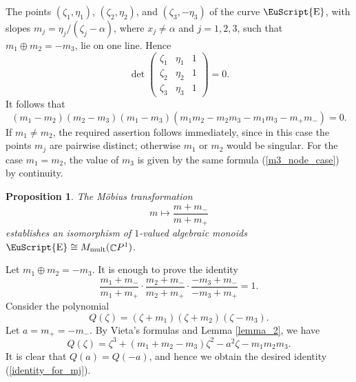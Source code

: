 \documentclass[14pt, dvipsnames]{extarticle}
\makeatletter
\theoremstyle{plain}
\newtheorem{prop}{Proposition}
\theoremstyle{definition}
\theoremstyle{remark}
\renewenvironment{proof}[1][\proofname]{
  \par\pushQED{\qed}\normalfont
  \topsep6\p@\@plus6\p@\relax
  \trivlist\item[\hskip\labelsep\bfseries\itshape #1\@addpunct{.}]
}{\popQED\endtrivlist\@endpefalse}
\DeclareMathOperator{\E}{\EuScript{E}}
\DeclareMathOperator{\Cc}{\mathbb{C}}
\DeclareMathOperator{\mult}{\mathrm{mult}}
\makeatother
\begin{document}
\begin{proof}
The points $(\zeta_1, \eta_1)$, $(\zeta_2, \eta_2)$, and $(\zeta_3, -\eta_3)$ of the curve $\E$, with slopes $m_j = \eta_j/(\zeta_j - \alpha)$, where $x_j\neq \alpha$ and $j = 1, 2, 3$, such that $m_1\oplus m_2 = -m_3$, lie on one line. Hence
$$\det\left (\begin{matrix} \zeta_1 & \eta_1 & 1\\ \zeta_2 & \eta_2 & 1\\ \zeta_3 & \eta_3 & 1  \end{matrix} \right ) = 0.$$
It follows that
$$(m_1 - m_2)(m_2 - m_3)(m_1 - m_3)(m_1m_2 - m_2m_3 - m_1m_3 -m_{+}m_{-}) = 0.$$
If $m_1\neq m_2$, the required assertion follows immediately, since in this case the points $m_j$ are pairwise distinct; otherwise $m_1$ or $m_2$ would be singular. For the case $m_1 = m_2$, the value of $m_3$ is given by the same formula (\ref{m3_node_case}) by continuity. 
\end{proof}

\begin{prop}\label{E_cong_G_m_mult_case}
The Möbius transformation
\begin{equation}\label{Mobius_transform}
m\mapsto \frac{m + m_{-}}{m + m_{+}}
\end{equation}
establishes an isomorphism of $1$-valued algebraic monoids $\E\cong M_{\mult}(\Cc\!P^1)$.
\end{prop}

\begin{proof}
Let $m_1\oplus m_2 = -m_3$. It is enough to prove the identity
\begin{equation}\label{identity_for_mj}
\frac{m_1 + m_{-}}{m_1 + m_{+}}\cdot \frac{m_2 + m_{-}}{m_2 + m_{+}}\cdot \frac{-m_3 + m_{-}}{-m_3 + m_{+}} = 1.
\end{equation}
Consider the polynomial
$$Q(\zeta) = (\zeta + m_1)(\zeta + m_2)(\zeta - m_3).$$
Let $a = m_{+} = -m_{-}$. By Vieta's formulas and Lemma \ref{lemma_2}, we have
$$Q(\zeta) = \zeta^3 + (m_1 + m_2 - m_3) \zeta^2 - a^2 \zeta - m_1m_2m_3.$$
It is clear that $Q(a) = Q(-a)$, and hence we obtain the desired identity (\ref{identity_for_mj}).
\end{proof}
\end{document}
